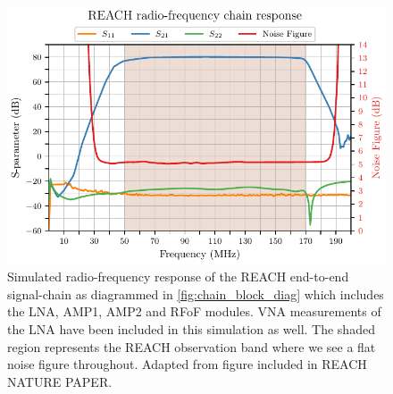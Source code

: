 \begin{figure}
    \centering
    \includegraphics{chain_sim}
    \caption{Simulated radio-frequency response of the REACH end-to-end signal-chain as diagrammed in \cref{fig:chain_block_diag} which includes the LNA, AMP1, AMP2 and RFoF modules. VNA measurements of the LNA have been included in this simulation as well. The shaded region represents the REACH observation band where we see a flat noise figure throughout. Adapted from figure included in REACH NATURE PAPER.}
    \label{fig:chain_sim}
\end{figure}


